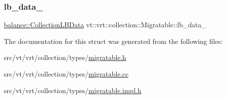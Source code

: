 \mbox{\label{structvt_1_1vrt_1_1collection_1_1_migratable_ac910af17909a000a421c83a959c33970}} 
\subsubsection{\texorpdfstring{lb\+\_\+data\+\_\+}{lb\_data\_}}
{\footnotesize\ttfamily \hyperlink{structvt_1_1vrt_1_1collection_1_1balance_1_1_collection_l_b_data}{balance\+::\+Collection\+L\+B\+Data} vt\+::vrt\+::collection\+::\+Migratable\+::lb\+\_\+data\+\_\+\hspace{0.3cm}{\ttfamily [protected]}}



The documentation for this struct was generated from the following files\+:\begin{DoxyCompactItemize}
\item 
src/vt/vrt/collection/types/\hyperlink{migratable_8h}{migratable.\+h}\item 
src/vt/vrt/collection/types/\hyperlink{migratable_8cc}{migratable.\+cc}\item 
src/vt/vrt/collection/types/\hyperlink{migratable_8impl_8h}{migratable.\+impl.\+h}\end{DoxyCompactItemize}
